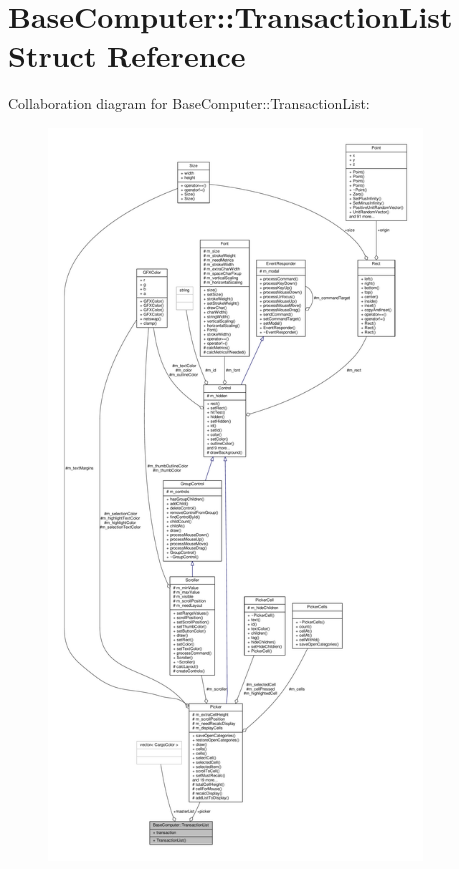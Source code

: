 \hypertarget{structBaseComputer_1_1TransactionList}{}\section{Base\+Computer\+:\+:Transaction\+List Struct Reference}
\label{structBaseComputer_1_1TransactionList}


Collaboration diagram for Base\+Computer\+:\+:Transaction\+List\+:
\nopagebreak
\begin{figure}[H]
\begin{center}
\leavevmode
\includegraphics[height=550pt]{d3/d88/structBaseComputer_1_1TransactionList__coll__graph}
\end{center}
\end{figure}
